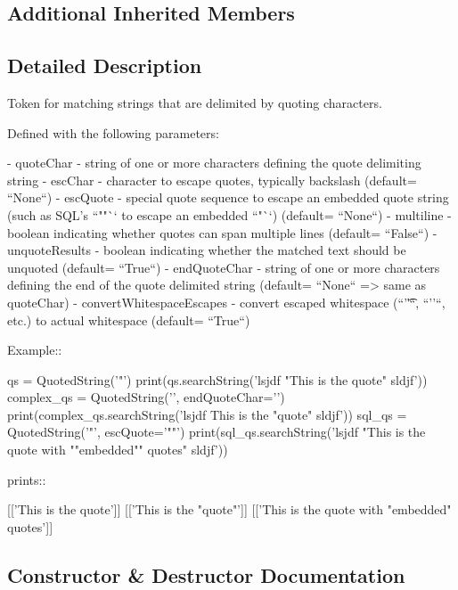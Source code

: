 \subsection*{Additional Inherited Members}


\subsection{Detailed Description}
\begin{DoxyVerb}Token for matching strings that are delimited by quoting characters.

Defined with the following parameters:

    - quoteChar - string of one or more characters defining the
      quote delimiting string
    - escChar - character to escape quotes, typically backslash
      (default= ``None``)
    - escQuote - special quote sequence to escape an embedded quote
      string (such as SQL's ``""`` to escape an embedded ``"``)
      (default= ``None``)
    - multiline - boolean indicating whether quotes can span
      multiple lines (default= ``False``)
    - unquoteResults - boolean indicating whether the matched text
      should be unquoted (default= ``True``)
    - endQuoteChar - string of one or more characters defining the
      end of the quote delimited string (default= ``None``  => same as
      quoteChar)
    - convertWhitespaceEscapes - convert escaped whitespace
      (``'\t'``, ``'\n'``, etc.) to actual whitespace
      (default= ``True``)

Example::

    qs = QuotedString('"')
    print(qs.searchString('lsjdf "This is the quote" sldjf'))
    complex_qs = QuotedString('{{', endQuoteChar='}}')
    print(complex_qs.searchString('lsjdf {{This is the "quote"}} sldjf'))
    sql_qs = QuotedString('"', escQuote='""')
    print(sql_qs.searchString('lsjdf "This is the quote with ""embedded"" quotes" sldjf'))

prints::

    [['This is the quote']]
    [['This is the "quote"']]
    [['This is the quote with "embedded" quotes']]
\end{DoxyVerb}
 

\subsection{Constructor \& Destructor Documentation}
\mbox{\label{classpyparsing_1_1QuotedString_abb103669400ef33107fb60ed95679a9d}} 
